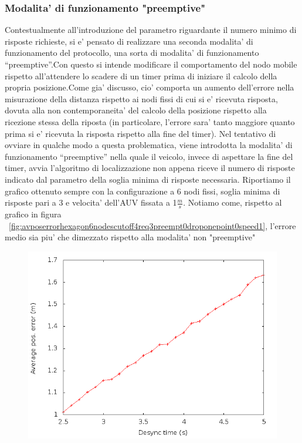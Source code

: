 \subsubsection{Modalita' di funzionamento "preemptive"}
Contestualmente all'introduzione del parametro riguardante il numero minimo di risposte richieste, si e' pensato di realizzare una seconda modalita' di funzionamento del protocollo, una sorta di modalita' di funzionamento ``preemptive''.\newline Con questo si intende modificare il comportamento del nodo mobile rispetto all'attendere lo scadere di un timer prima di iniziare il calcolo della propria posizione.\newline Come gia' discusso, cio' comporta un aumento dell'errore nella misurazione della distanza rispetto ai nodi fissi di cui si e' ricevuta risposta, dovuta alla non contemporaneita' del calcolo della posizione rispetto alla ricezione stessa della riposta (in particolare, l'errore sara' tanto maggiore quanto prima si e' ricevuta la risposta rispetto alla fine del timer).\newline
Nel tentativo di ovviare in qualche modo a questa problematica, viene introdotta la modalita' di funzionamento ``preemptive'' nella quale il veicolo, invece di aspettare la fine del timer,  avvia l'algoritmo di localizzazione non appena riceve il numero di risposte indicato dal parametro della soglia minima di risposte necessaria.\newline
Riportiamo il grafico ottenuto sempre con la configurazione a 6 nodi fissi, soglia minima di risposte pari a 3 e velocita' dell'AUV fissata a 1$\frac{m}{s}$. Notiamo come, rispetto al grafico in figura ~\ref{fig:avposerrorhexagon6nodescutoff4req3preempt0droponepoint0speed1}, l'errore medio sia piu' che dimezzato rispetto alla modalita' non "preemptive"
\begin{figure}[H]
    \includegraphics[scale=0.5]{avposerrorhexagon6nodescutoff4req3preempt1droponepoint0speed1.png}
    \centering
\end{figure}

